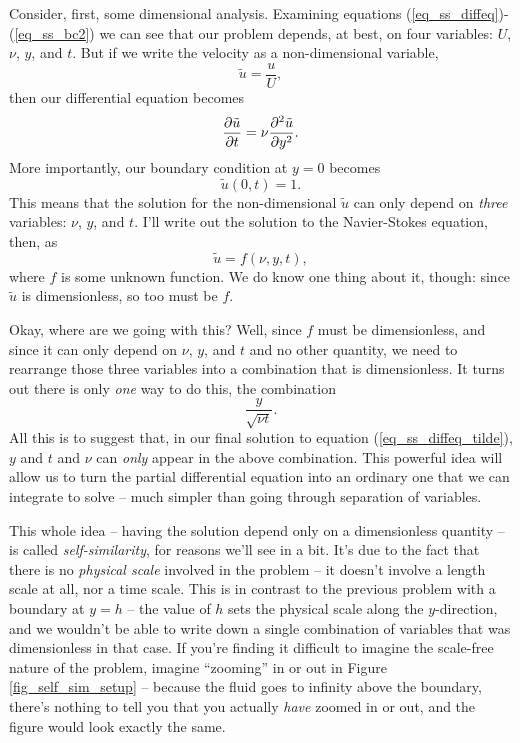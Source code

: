 Consider, first, some dimensional analysis.  Examining equations (\ref{eq_ss_diffeq})-(\ref{eq_ss_bc2}) we can see that our problem depends, at best, on four variables: $U$, $\nu$, $y$, and $t$.  But if we write the velocity as a non-dimensional variable,
\[
\tilde{u} = \frac{u}{U},
\]
then our differential equation becomes
\begin{equation}
\label{eq_ss_diffeq_tilde}
\frac{\partial {\tilde{u}}}{\partial {t}} = \nu \frac{\partial^2 {\tilde{u}}}{\partial {y}^2}.
\end{equation}
More importantly, our boundary condition at $y=0$ becomes
\[
\tilde{u}(0, t) = 1.
\]
This means that the solution for the non-dimensional $\tilde{u}$ can only depend on \emph{three} variables:  $\nu$, $y$, and $t$.  I'll write out the solution to the Navier-Stokes equation, then, as
\[
\tilde{u} = f(\nu, y, t),
\]
where $f$ is some unknown function.  We do know one thing about it, though:  since $\tilde{u}$ is dimensionless, so too must be $f$.

Okay, where are we going with this?  Well, since $f$ must be dimensionless, and since it can only depend on $\nu$, $y$, and $t$ and no other quantity, we need to rearrange those three variables into a combination that is dimensionless.  It turns out there is only \emph{one} way to do this, the combination
\[
\frac{y}{\sqrt{\nu t}}.
\]
All this is to suggest that, in our final solution to equation (\ref{eq_ss_diffeq_tilde}), $y$ and $t$ and $\nu$ can \emph{only} appear in the above combination.  This powerful idea will allow us to turn the partial differential equation into an ordinary one that we can integrate to solve -- much simpler than going through separation of variables.

This whole idea -- having the solution depend only on a dimensionless quantity -- is called \emph{self-similarity}, for reasons we'll see in a bit.  It's due to the fact that there is no \emph{physical scale} involved in the problem -- it doesn't involve a length scale at all, nor a time scale.  This is in contrast to the previous problem with a boundary at $y=h$ -- the value of $h$ sets the physical scale along the $y$-direction, and we wouldn't be able to write down a single combination of variables that was dimensionless in that case.  If you're finding it difficult to imagine the scale-free nature of the problem, imagine ``zooming'' in or out in Figure \ref{fig_self_sim_setup} -- because the fluid goes to infinity above the boundary, there's nothing to tell you that you actually \emph{have} zoomed in or out, and the figure would look exactly the same.

